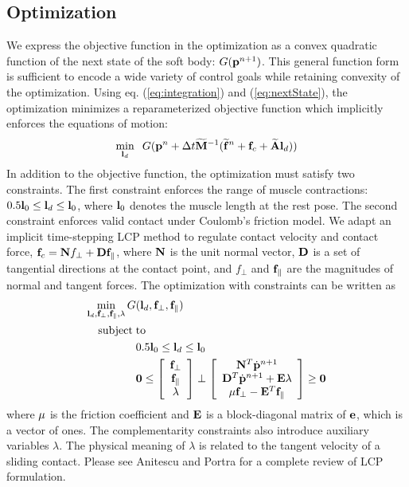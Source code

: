 \subsection{Optimization}
We express the objective function in the optimization as a convex
quadratic function of the next state of the soft body: $G(\mathbf{p}^{n+1})$.
This general function form is sufficient to encode a wide variety of
control goals while retaining convexity of the optimization. Using
eq. (\ref{eq:integration}) and (\ref{eq:nextState}), the optimization
minimizes a reparameterized objective function which implicitly enforces
the equations of motion:
\begin{equation}
\min_{\vc{l}_d} \;\;G(\vc{p}^{n}+\Delta t \vc{\widetilde{M}}^{-1}(\vc{\widetilde{f}}^n +\vc{f}_c + \vc{\widetilde{A}} \vc{l}_d))
\label{eq:objectiveFunction}
\end{equation}
In addition to the objective function, the optimization must satisfy two
constraints. The first constraint enforces the range of muscle
contractions: $0.5 \mathbf{l}_0 \leq \mathbf{l}_d \leq \mathbf{l}_0$, where $\mathbf{l}_0$ denotes the muscle length at the rest pose. The second constraint enforces valid contact under Coulomb's friction model. We adapt an implicit time-stepping LCP method to regulate contact velocity and contact force, $\mathbf{f}_c = \mathbf{N} f_\perp + \mathbf{D}\mathbf{f}_\parallel$, where $\mathbf{N}$ is the unit normal vector, $\mathbf{D}$ is a set of tangential directions at the contact point, and $f_\perp$ and $\mathbf{f}_\parallel$ are the magnitudes of normal and tangent forces. The optimization with constraints can be written as
\begin{align}
\label{eqn:softOptimization}
 \min_{\vc{l}_d,\vc{f}_\perp,\vc{f}_\parallel,\lambda} G&(\vc{l}_d,\vc{f}_\perp,\vc{f}_\parallel)  \\
\nonumber  \mathrm{subject\;} &\mathrm{to} \\
\nonumber   &0.5\vc{l}_0 \leq \vc{l}_d \leq \vc{l}_0 \\
\nonumber  &\vc{0} \leq \left[ \begin{array}{c} \vc{f}_\perp \\ \vc{f}_\parallel \\ \lambda \end{array} \right] \perp
 \left[ \begin{array}{c} \vc{N}^T\dot{\vc{p}}^{n+1} \\ \vc{D}^T \dot{\vc{p}}^{n+1} + \vc{E} \lambda \\ \mu \vc{f}_\perp - \vc{E}^T \vc{f}_\parallel \end{array} \right] \geq \vc{0}
\end{align}
where $\mathbf{\mu}$ is the friction coefficient and $\mathbf{E}$ is a
block-diagonal matrix of $\mathbf{e}$, which is a vector of ones. The
complementarity constraints also introduce auxiliary variables
$\lambda$. The physical meaning of $\lambda$ is related to the tangent
velocity of a sliding contact. Please see Anitescu and Portra
\cite{Anitescu:1997} for a complete review of LCP formulation.

